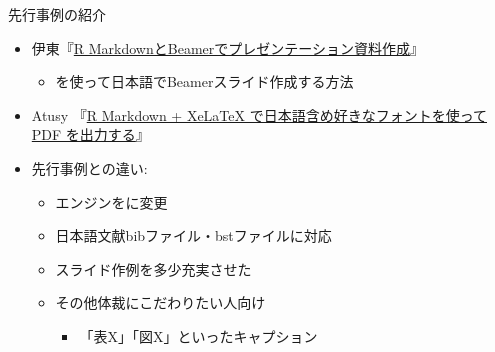 \documentclass[
  12pt,
  ignorenonframetext,
]{beamer}
\providecommand{\tightlist}{%
  \setlength{\itemsep}{0pt}\setlength{\parskip}{0pt}}
\begin{document}
\begin{frame}{先行事例の紹介}
\protect\hypertarget{ux5148ux884cux4e8bux4f8bux306eux7d39ux4ecb}{}

\begin{itemize}
\tightlist
\item
  伊東『\href{https://www.slideshare.net/hirokito/r-markdownbeamer-88777082}{R
  MarkdownとBeamerでプレゼンテーション資料作成}』

  \begin{itemize}
  \tightlist
  \item
    \LuaLaTeX を使って日本語でBeamerスライド作成する方法
  \end{itemize}
\item
  Atusy 『\href{https://blog.atusy.net/2019/05/14/rmd2pdf-any-font/}{R
  Markdown + XeLaTeX で日本語含め好きなフォントを使って PDF
  を出力する}』
\item
  先行事例との違い:

  \begin{itemize}
  \tightlist
  \item
    エンジンを\XeLaTeX に変更
  \item
    日本語文献bibファイル・bstファイルに対応
  \item
    スライド作例を多少充実させた
  \item
    その他体裁にこだわりたい人向け

    \begin{itemize}
    \tightlist
    \item
      「表X」「図X」といったキャプション
    \end{itemize}
  \end{itemize}
\end{itemize}

\end{frame}
\end{document}
